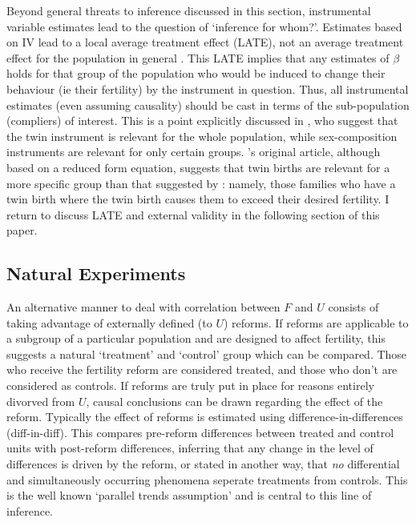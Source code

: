 Beyond general threats to inference discussed in this section, instrumental 
variable estimates lead to the question of `inference for whom?'.  Estimates 
based on IV lead to a local average treatment effect (LATE), not an average 
treatment effect for the population in general \citep{ImbensAngrist1994}.  This 
LATE implies that any estimates of $\beta$ holds for that group of the population 
who would be induced to change their behaviour (ie their fertility) by the 
instrument in question.  Thus, all instrumental estimates (even assuming causality)
should be cast in terms of the sub-population (compliers) of interest.  This is
a point explicitly discussed in \citet{Angristetal2010}, who suggest that the
twin instrument is relevant for the whole population, while sex-composition 
instruments are relevant for only certain groups. \citet{RosenzweigWolpin1980}'s 
original article, although based on a reduced form equation, suggests that twin 
births are relevant for a more specific group than that suggested by 
\citet{Angristetal2010}: namely, those families who have a twin birth where
the twin birth causes them to exceed their desired fertility.  I return to discuss 
LATE and external validity in the following section of this paper.



\subsection{Natural Experiments}
\label{Fsscn:kidNExp}
An alternative manner to deal with correlation between $F$ and $U$ consists of
taking advantage of externally defined (to $U$) reforms.  If reforms are 
applicable to a subgroup of a particular population and are designed to affect
fertility, this suggests a natural `treatment' and `control' group which can
be compared.  Those who receive the fertility reform are considered treated, and
those who don't are considered as controls.  If reforms are truly put in place
for reasons entirely divorved from $U$, causal conclusions can be drawn regarding
the effect of the reform.  Typically the effect of reforms is estimated using 
difference-in-differences (diff-in-diff).  This compares pre-reform differences
between treated and control units with post-reform differences, inferring that
any change in the level of differences is driven by the reform, or stated in
another way, that \emph{no} differential and simultaneously occurring phenomena
seperate treatments from controls.  This is the well known `parallel trends
assumption' and is central to this line of inference.  


